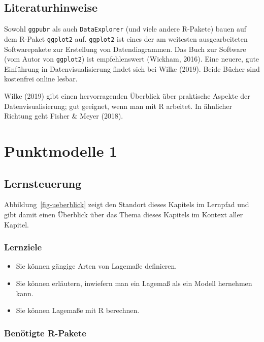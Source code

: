 \documentclass[
  letterpaper,
]{scrbook}
\providecommand{\tightlist}{%
  \setlength{\itemsep}{0pt}\setlength{\parskip}{0pt}}\usepackage{longtable,booktabs,array}
\theoremstyle{definition}
\theoremstyle{definition}
\theoremstyle{definition}
\theoremstyle{remark}
\begin{document}
\section{Literaturhinweise}\label{literaturhinweise-3}

Sowohl \texttt{ggpubr} als auch \texttt{DataExplorer} (und viele andere
R-Pakete) bauen auf dem R-Paket \texttt{ggplot2} auf. \texttt{ggplot2}
ist eines der am weitesten ausgearbeiteten Softwarepakete zur Erstellung
von Datendiagrammen. Das Buch zur Software (vom Autor von
\texttt{ggplot2}) ist empfehlenswert (Wickham, 2016). Eine neuere, gute
Einführung in Datenvisualisierung findet sich bei Wilke (2019). Beide
Bücher sind kostenfrei online lesbar.

Wilke (2019) gibt einen hervorragenden Überblick über praktische Aspekte
der Datenvisualisierung; gut geeignet, wenn man mit R arbeitet. In
ähnlicher Richtung geht Fisher \& Meyer (2018).

\chapter{Punktmodelle 1}\label{sec-punktmodelle1}

\section{Lernsteuerung}\label{lernsteuerung-4}

Abbildung~\ref{fig-ueberblick} zeigt den Standort dieses Kapitels im
Lernpfad und gibt damit einen Überblick über das Thema dieses Kapitels
im Kontext aller Kapitel.

\subsection{Lernziele}\label{lernziele-5}

\begin{itemize}
\tightlist
\item
  Sie können gängige Arten von Lagemaße definieren.
\item
  Sie können erläutern, inwiefern man ein Lagemaß als ein Modell
  hernehmen kann.
\item
  Sie können Lagemaße mit R berechnen.
\end{itemize}

\subsection{Benötigte R-Pakete}\label{benuxf6tigte-r-pakete-2}
\end{document}
